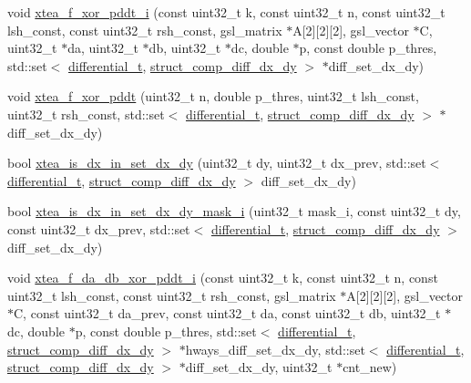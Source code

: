 \begin{DoxyCompactItemize}
\item 
void \hyperlink{xtea-f-xor-pddt_8cc_a9646abec85abfa040d9f4e854f408408}{xtea\-\_\-f\-\_\-xor\-\_\-pddt\-\_\-i} (const uint32\-\_\-t k, const uint32\-\_\-t n, const uint32\-\_\-t lsh\-\_\-const, const uint32\-\_\-t rsh\-\_\-const, gsl\-\_\-matrix $\ast$\-A\mbox{[}2\mbox{]}\mbox{[}2\mbox{]}\mbox{[}2\mbox{]}, gsl\-\_\-vector $\ast$\-C, uint32\-\_\-t $\ast$da, uint32\-\_\-t $\ast$db, uint32\-\_\-t $\ast$dc, double $\ast$p, const double p\-\_\-thres, std\-::set$<$ \hyperlink{structdifferential__t}{differential\-\_\-t}, \hyperlink{structstruct__comp__diff__dx__dy}{struct\-\_\-comp\-\_\-diff\-\_\-dx\-\_\-dy} $>$ $\ast$diff\-\_\-set\-\_\-dx\-\_\-dy)
\item 
void \hyperlink{xtea-f-xor-pddt_8cc_a7b7008eb382fd5465162899639968376}{xtea\-\_\-f\-\_\-xor\-\_\-pddt} (uint32\-\_\-t n, double p\-\_\-thres, uint32\-\_\-t lsh\-\_\-const, uint32\-\_\-t rsh\-\_\-const, std\-::set$<$ \hyperlink{structdifferential__t}{differential\-\_\-t}, \hyperlink{structstruct__comp__diff__dx__dy}{struct\-\_\-comp\-\_\-diff\-\_\-dx\-\_\-dy} $>$ $\ast$diff\-\_\-set\-\_\-dx\-\_\-dy)
\item 
bool \hyperlink{xtea-f-xor-pddt_8cc_a2bd3a0eacc4915a2812e472f63d8f8f0}{xtea\-\_\-is\-\_\-dx\-\_\-in\-\_\-set\-\_\-dx\-\_\-dy} (uint32\-\_\-t dy, uint32\-\_\-t dx\-\_\-prev, std\-::set$<$ \hyperlink{structdifferential__t}{differential\-\_\-t}, \hyperlink{structstruct__comp__diff__dx__dy}{struct\-\_\-comp\-\_\-diff\-\_\-dx\-\_\-dy} $>$ diff\-\_\-set\-\_\-dx\-\_\-dy)
\item 
bool \hyperlink{xtea-f-xor-pddt_8cc_a8f4e87a925cc85b110b7e5b7ef23fd0b}{xtea\-\_\-is\-\_\-dx\-\_\-in\-\_\-set\-\_\-dx\-\_\-dy\-\_\-mask\-\_\-i} (uint32\-\_\-t mask\-\_\-i, const uint32\-\_\-t dy, const uint32\-\_\-t dx\-\_\-prev, std\-::set$<$ \hyperlink{structdifferential__t}{differential\-\_\-t}, \hyperlink{structstruct__comp__diff__dx__dy}{struct\-\_\-comp\-\_\-diff\-\_\-dx\-\_\-dy} $>$ diff\-\_\-set\-\_\-dx\-\_\-dy)
\item 
void \hyperlink{xtea-f-xor-pddt_8cc_a1fac191611cec314a5acf32b8e8f166f}{xtea\-\_\-f\-\_\-da\-\_\-db\-\_\-xor\-\_\-pddt\-\_\-i} (const uint32\-\_\-t k, const uint32\-\_\-t n, const uint32\-\_\-t lsh\-\_\-const, const uint32\-\_\-t rsh\-\_\-const, gsl\-\_\-matrix $\ast$\-A\mbox{[}2\mbox{]}\mbox{[}2\mbox{]}\mbox{[}2\mbox{]}, gsl\-\_\-vector $\ast$\-C, const uint32\-\_\-t da\-\_\-prev, const uint32\-\_\-t da, const uint32\-\_\-t db, uint32\-\_\-t $\ast$dc, double $\ast$p, const double p\-\_\-thres, std\-::set$<$ \hyperlink{structdifferential__t}{differential\-\_\-t}, \hyperlink{structstruct__comp__diff__dx__dy}{struct\-\_\-comp\-\_\-diff\-\_\-dx\-\_\-dy} $>$ $\ast$hways\-\_\-diff\-\_\-set\-\_\-dx\-\_\-dy, std\-::set$<$ \hyperlink{structdifferential__t}{differential\-\_\-t}, \hyperlink{structstruct__comp__diff__dx__dy}{struct\-\_\-comp\-\_\-diff\-\_\-dx\-\_\-dy} $>$ $\ast$diff\-\_\-set\-\_\-dx\-\_\-dy, uint32\-\_\-t $\ast$cnt\-\_\-new)

\end{DoxyCompactItemize}
